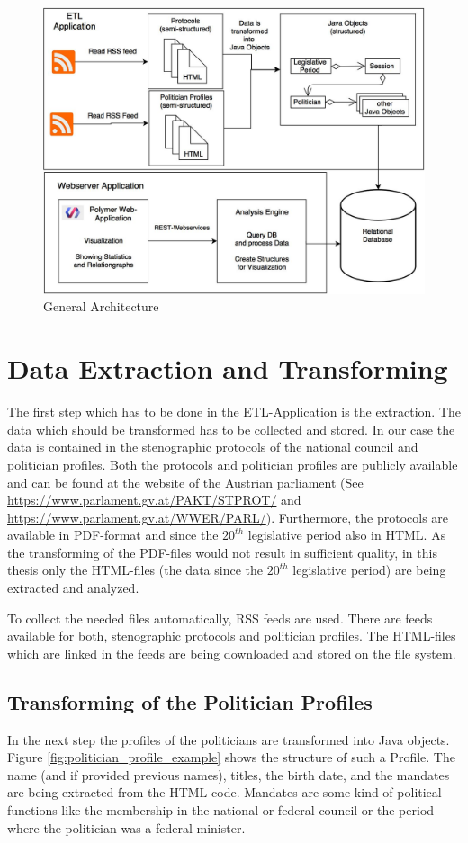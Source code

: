 \begin{figure}
	\centering
	\includegraphics[width=\textwidth]{imgs/overall_architecture}
	\caption{General Architecture}
	\label{fig:general_architecture}
\end{figure}

\section{Data Extraction and Transforming}
\label{sec:data_extraction_transforming}
The first step which has to be done in the ETL-Application is the extraction. The data which should be transformed has to be collected and stored. In our case the data is contained in the stenographic protocols of the national council and politician profiles. Both the protocols and politician profiles are publicly available and can be found at the website of the Austrian parliament (See \url{https://www.parlament.gv.at/PAKT/STPROT/} and \url{https://www.parlament.gv.at/WWER/PARL/}). Furthermore, the protocols are available in PDF-format and since the $20^{th}$ legislative period also in HTML. As the transforming of the PDF-files would not result in sufficient quality, in this thesis only the HTML-files (the data since the $20^{th}$ legislative period) are being extracted and analyzed.

To collect the needed files automatically, RSS feeds are used. There are feeds available for both, stenographic protocols and politician profiles. The HTML-files which are linked in the feeds are being downloaded and stored on the file system.

\subsection{Transforming of the Politician Profiles}
In the next step the profiles of the politicians are transformed into Java objects. Figure \ref{fig:politician_profile_example} shows the structure of such a Profile. The name (and if provided previous names), titles, the birth date, and the mandates are being extracted from the HTML code. Mandates are some kind of political functions like the membership in the national or federal council or the period where the politician was a federal minister.

